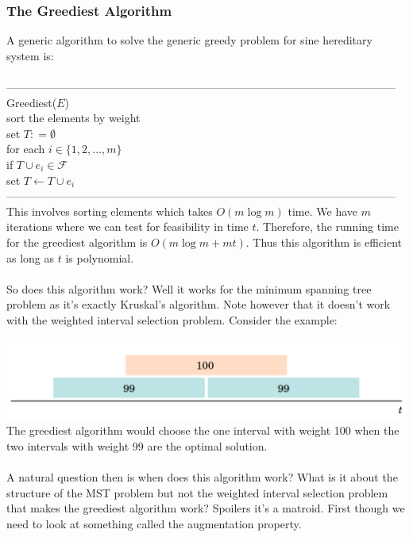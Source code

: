 \documentclass{article}
\newcommand{\emp}{\emptyset}
\newcommand{\mcal}[1]{\mathcal{#1}}
\begin{document}
\subsubsection{The Greediest Algorithm}
A generic algorithm to solve the generic greedy problem for sine hereditary system is:\\\\
---------------------------------------------------------------------------------------------------------
Greediest($E$)\\
	\hspace*{7mm} sort the elements by weight\\
	\hspace*{7mm} set $T : = \emp$\\
	\hspace*{7mm} for each $i \in \{1, 2, \dots, m\}$\\
	\hspace*{14mm} if $T \cup e_i \in \mcal{F}$\\
	\hspace*{21mm} set $T \leftarrow T \cup e_i$\\
---------------------------------------------------------------------------------------------------------\\
This involves sorting elements which takes $O(m \log m)$ time. We have $m$ iterations where we can test for feasibility in time $t$. Therefore, the running time for the greediest algorithm is $O(m \log m + mt)$. Thus this algorithm is efficient as long as $t$ is polynomial.\\\\
So does this algorithm work? Well it works for the minimum spanning tree problem as it's exactly Kruskal's algorithm. Note however that it doesn't work with the weighted interval selection problem. Consider the example:\\\\
\includegraphics[scale=0.315]{gace}\\
The greediest algorithm would choose the one interval with weight 100 when the two intervals with weight 99 are the optimal solution.\\\\
A natural question then is when does this algorithm work? What is it about the structure of the MST problem but not the weighted interval selection problem that makes the greediest algorithm work? Spoilers it's a matroid. First though we need to look at something called the augmentation property.
\end{document}
